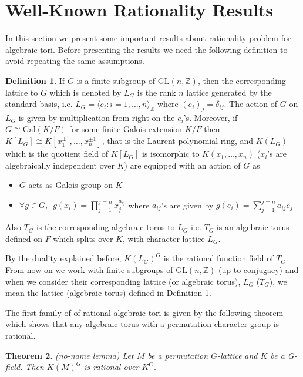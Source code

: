 \documentclass[12pt]{article}
\theoremstyle{plain}
\newtheorem{theorem}{Theorem}
\theoremstyle{definition}
\newtheorem{definition}[theorem]{Definition}
\newcommand{\Z}{\ensuremath{\mathbb{Z}}}
\newcommand{\G}{G}
\newcommand{\glat}{$G$-lattice}
\begin{document}
\section{Well-Known Rationality Results}\label{sec:ratres}
In this section we present some important results about rationality problem for 
algebraic tori. Before presenting the results we need the following definition 
to avoid repeating the same assumptions.
\begin{definition}\label{Assumption}
If $G$ is a finite subgroup of $\mathrm{GL}(n,\Z)$, then the corresponding lattice 
to $G$ which is denoted by $L_G$ is the rank $n$ lattice generated by the standard 
basis, i.e. $L_G = \langle e_i : i  = 1, \ldots, n \rangle_\Z$ where $(e_i)_j = \delta_{ij}$. 
The action of $G$ on $L_G$ is given by multiplication from right on the $e_i$'s.
 Moreover, if $G \cong \mathrm{Gal}(K/F)$ for some finite Galois extension $K/F$ 
 then $K[L_G] \cong K[x^{\pm 1}_1, \ldots , x^{\pm 1}_n]$, that is the Laurent 
 polynomial ring, and $K(L_G)$ which is the quotient field of $K[L_G]$ is isomorphic 
 to $K(x_1, \ldots , x_n)$ ($x_i$'s are algebraically independent over $K$) are equipped 
 with an action of $G$ as
\begin{itemize}
\item $G$ acts as Galois group on $K$ 
\item $\forall g \in G, \,\,\, g(x_i) = \prod_{j=1}^{j=n} x_j^{a_{ij}}$  where $a_{ij}$'s 
are given by $g(e_i) = \sum_{j=1}^{j=n} a_{ij}e_j$.
\end{itemize}
Also $T_G$ is the corresponding algebraic torus to $L_G$ i.e. $T_G$ is an algebraic 
torus defined on $F$ which splits over $K$, with character lattice $L_G$. 
\end{definition}
\noindent
By the duality explained before, $K(L_G)^G$ is the rational function field of $T_G$. 
From now on we work with finite subgroups of $\mathrm{GL}(n,\Z)$ (up to conjugacy) and 
when we consider their corresponding lattice (or algebraic torus), $L_G$ ($T_G$), we 
mean the lattice (algebraic torus) defined in Definition \ref{Assumption}. 

The first family of of rational algebraic tori is given by the following theorem which 
shows that any algebraic torus with a permutation character group is rational.

\begin{theorem}\cite{Speiser}\label{thm:no-name lemma}
(no-name lemma) Let $M$ be a permutation \glat \,\,and $K$ be a \G-field. Then $K(M)^\G$ 
is rational over $K^\G$. 
\end{theorem}
\end{document}
